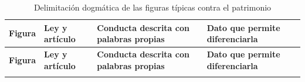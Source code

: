 \documentclass[spanish,letterpaper,oneside]{article}
\begin{document}
\begingroup
\scriptsize
\setlength{\tabcolsep}{3.5pt}
\renewcommand{\arraystretch}{1.18}
\begin{longtable}{@{}L{2.1cm} L{2.6cm} L{5.8cm} L{4.3cm}@{}}
\caption{Delimitaci\'on dogm\'atica de las figuras t\'ipicas contra el patrimonio}\label{tab:investigacion_patrimonial}\\
\toprule
{}
\textbf{Figura} & \textbf{Ley y art\'iculo} & \textbf{Conducta descrita con palabras propias} & \textbf{Dato que permite diferenciarla} \\
\midrule
\endfirsthead
\toprule
{}
\textbf{Figura} & \textbf{Ley y art\'iculo} & \textbf{Conducta descrita con palabras propias} & \textbf{Dato que permite diferenciarla} \\
\midrule
\endhead
\bottomrule
\endfoot


\end{longtable}
\end{document}
